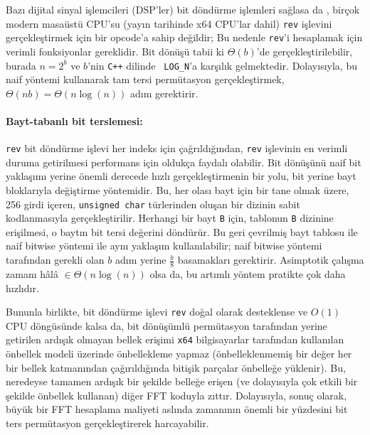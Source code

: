 \documentclass[10pt]{article}
\begin{document}
Baz{\i} dijital sinyal i\c{s}lemcileri (DSP'ler) bit d\"{o}nd\"{u}rme i\c{s}lemleri sa\u{g}lasa da
, bir\c{c}ok modern masa\"{u}st\"{u} CPU'su (yay{\i}n tarihinde x64 CPU'lar dahil) {\tt rev}
i\c{s}levini ger\c{c}ekle\c{s}tirmek i\c{c}in bir opcode'a sahip de\u{g}ildir; Bu nedenle {\tt rev}'i 
hesaplamak i\c{c}in verimli fonksiyonlar gereklidir. Bit d\"{o}n\"{u}\c{s}\"{u} tabii ki $\Theta(b)$'de 
 ger\c{c}ekle\c{s}tirilebilir, burada $n = 2^b$ ve $b$'nin {\tt C++} dilinde {\tt
  LOG\_N}'a kar\c{s}{\i}l{\i}k gelmektedir. Dolay{\i}s{\i}yla, bu naif y\"{o}ntemi kullanarak tam 
tersi perm\"{u}tasyon ger\c{c}ekle\c{s}tirmek, $\Theta(n b) = \Theta(n \log(n))$ ad{\i}m gerektirir.

\paragraph{Bayt-tabanl{\i} bit terslemesi:}

{\tt rev} bit d\"{o}nd\"{u}rme i\c{s}levi her indeks i\c{c}in \c{c}a\u{g}r{\i}ld{\i}\u{g}{\i}ndan, {\tt rev} i\c{s}levinin en verimli 
duruma getirilmesi performans i\c{c}in olduk\c{c}a faydal{\i} olabilir. Bit d\"{o}n\"{u}\c{s}\"{u}n\"{u} naif bit
yakla\c{s}{\i}m{\i} yerine \"{o}nemli derecede h{\i}zl{\i} ger\c{c}ekle\c{s}tirmenin bir yolu, bit yerine bayt
bloklar{\i}yla de\u{g}i\c{s}tirme y\"{o}ntemidir. Bu, her olas{\i} bayt i\c{c}in bir tane olmak \"{u}zere, 
256 girdi i\c{c}eren, {\tt unsigned char} t\"{u}rlerinden olu\c{s}an bir dizinin sabit kodlanmas{\i}yla 
ger\c{c}ekle\c{s}tirilir. Herhangi bir bayt {\tt B} i\c{c}in, tablonun {\tt B} dizinine 
eri\c{s}ilmesi, o bayt{\i}n bit tersi de\u{g}erini d\"{o}nd\"{u}r\"{u}r\cite{j:best,
anderson:bit}. Bu geri \c{c}evrilmi\c{s} bayt tablosu 
ile naif bitwise y\"{o}ntemi ile ayn{\i} yakla\c{s}{\i}m kullan{\i}labilir; naif bitwise y\"{o}ntemi 
taraf{\i}ndan gerekli olan $b$ ad{\i}m yerine $\frac{b}{8}$ basamaklar{\i} gerektirir. 
Asimptotik \c{c}al{\i}\c{s}ma zaman{\i} h\^{a}l\^{a} $\in \Theta(n \log(n))$ olsa da, 
bu art{\i}ml{\i} y\"{o}ntem pratikte \c{c}ok daha h{\i}zl{\i}d{\i}r.

Bununla birlikte, bit d\"{o}nd\"{u}rme i\c{s}levi {\tt rev} do\u{g}al olarak desteklense ve $O(1)$ 
CPU d\"{o}ng\"{u}s\"{u}nde kalsa da, bit d\"{o}n\"{u}\c{s}\"{u}ml\"{u} perm\"{u}tasyon taraf{\i}ndan yerine getirilen 
ard{\i}\c{s}{\i}k olmayan bellek eri\c{s}imi {\tt x64} bilgisayarlar taraf{\i}ndan kullan{\i}lan 
\"{o}nbellek modeli \"{u}zerinde \"{o}nbellekleme yapmaz (\"{o}nbelleklenmemi\c{s} bir de\u{g}er her bir 
bellek katman{\i}ndan \c{c}a\u{g}{\i}r{\i}ld{\i}\u{g}{\i}nda biti\c{s}ik par\c{c}alar \"{o}nbelle\u{g}e y\"{u}klenir). 
Bu, neredeyse tamamen ard{\i}\c{s}{\i}k bir \c{s}ekilde belle\u{g}e eri\c{s}en (ve dolay{\i}s{\i}yla \c{c}ok etkili
bir \c{s}ekilde \"{o}nbellek kullanan) di\u{g}er FFT koduyla z{\i}tt{\i}r. Dolay{\i}s{\i}yla, sonu\c{c} olarak,
b\"{u}y\"{u}k bir FFT hesaplama maliyeti asl{\i}nda zaman{\i}n{\i}n \"{o}nemli bir y\"{u}zdesini bit ters 
perm\"{u}tasyon ger\c{c}ekle\c{s}tirerek harcayabilir.
\end{document}
